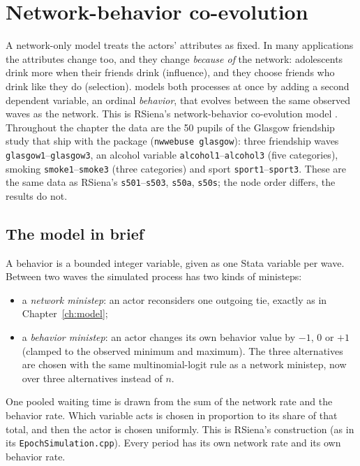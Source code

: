 \chapter{Network-behavior co-evolution}\label{ch:coevolution}
\begingroup\raggedright\sloppy

A network-only model treats the actors' attributes as fixed. In many applications the attributes change too, and they change \emph{because of} the network: adolescents drink more when their friends drink (influence), and they choose friends who drink like they do (selection). \nwsaom{} models both processes at once by adding a second dependent variable, an ordinal \emph{behavior}, that evolves between the same observed waves as the network. This is RSiena's network-behavior co-evolution model \cite{steglich2010}. Throughout the chapter the data are the 50 pupils of the Glasgow friendship study that ship with the package (\texttt{nwwebuse glasgow}): three friendship waves \texttt{glasgow1}--\texttt{glasgow3}, an alcohol variable \texttt{alcohol1}--\texttt{alcohol3} (five categories), smoking \texttt{smoke1}--\texttt{smoke3} (three categories) and sport \texttt{sport1}--\texttt{sport3}. These are the same data as RSiena's \texttt{s501}--\texttt{s503}, \texttt{s50a}, \texttt{s50s}; the node order differs, the results do not.

\section{The model in brief}

A behavior is a bounded integer variable, given as one Stata variable per wave. Between two waves the simulated process has two kinds of ministeps:
\begin{itemize}[nosep]
\item a \emph{network ministep}: an actor reconsiders one outgoing tie, exactly as in Chapter~\ref{ch:model};
\item a \emph{behavior ministep}: an actor changes its own behavior value by $-1$, $0$ or $+1$ (clamped to the observed minimum and maximum). The three alternatives are chosen with the same multinomial-logit rule as a network ministep, now over three alternatives instead of $n$.
\end{itemize}
One pooled waiting time is drawn from the sum of the network rate and the behavior rate. Which variable acts is chosen in proportion to its share of that total, and then the actor is chosen uniformly. This is RSiena's construction (as in its \texttt{EpochSimulation.cpp}). Every period has its own network rate and its own behavior rate.

